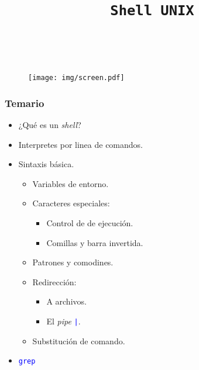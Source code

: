 \documentclass[11pt,a4paper,spanish]{beamer}
\title{\textbf{\texttt{Shell UNIX}}}
\author{}
\date{}
\newcommand{\cw}[1]{\mbox{\texttt{\textcolor{blue}{#1}}}}
\begin{document}
\begin{frame}[noframenumbering]

    \maketitle
    \centering
    \vspace{-8em}~
    \begin{figure}
    \texttt{[image: img/screen.pdf]}
    \end{figure}

\end{frame}

\begin{frame}[label=temario]

    \frametitle{Temario}

\begin{itemize}

    \item ¿Qué es un \emph{shell}?
    \item Interpretes por linea de comandos.

    \item Sintaxis básica.
        \begin{itemize}
            \item Variables de entorno.
            \item Caracteres especiales:
            \begin{itemize}
                \item Control de de ejecución.
                \item Comillas y barra invertida.
            \end{itemize}
        \item Patrones y comodines.
        \item Redirección:
            \begin{itemize}
                \item A archivos.
                \item El \emph{pipe} \cw{|}.
            \end{itemize}
        \item Substitución de comando.
        \end{itemize}
    \item \cw{grep}

\end{itemize}

\end{frame}
\end{document}
